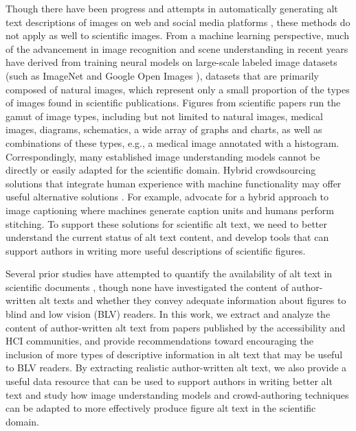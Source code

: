\documentclass[sigconf]{acmart}
\begin{document}
Though there have been progress and attempts in automatically generating alt text descriptions of images on web and social media platforms \citep{Wu2017AutomaticAC, Morris2018RichRO, Gleason2020TwitterAA}, these methods do not apply as well to scientific images. From a machine learning perspective, much of the advancement in image recognition and scene understanding in recent years have derived from training neural models on large-scale labeled image datasets (such as ImageNet \citep{Russakovsky2015ImageNetLS} and Google Open Images \citep{Kuznetsova2020TheOI}), datasets that are primarily composed of natural images, which represent only a small proportion of the types of images found in scientific publications. Figures from scientific papers run the gamut of image types, including but not limited to natural images, medical images, diagrams, schematics, a wide array of graphs and charts, as well as combinations of these types, e.g., a medical image annotated with a histogram. Correspondingly, many established image understanding models cannot be directly or easily adapted for the scientific domain. Hybrid crowdsourcing solutions that integrate human experience with machine functionality may offer useful alternative solutions \citep{Gleason2020TwitterAA, Salisbury2017TowardSS, Gurari2018VizWizGC, qian-formative}. For example, \citet{qian-formative} advocate for a hybrid approach to image captioning where machines generate caption units and humans perform stitching. To support these solutions for scientific alt text, we need to better understand the current status of alt text content, and develop tools that can support authors in writing more useful descriptions of scientific figures. 

Several prior studies have attempted to quantify the availability of alt text in scientific documents \citep{Brady2015CreatingAP, Lazar2017MakingTF, Wang2021ImprovingTA}, though none have investigated the content of author-written alt texts and whether they convey adequate information about figures to blind and low vision (BLV) readers. 
In this work, we extract and analyze the content of author-written alt text from papers published by the accessibility and HCI communities, and provide recommendations toward encouraging the inclusion of more types of descriptive information in alt text that may be useful to BLV readers. By extracting realistic author-written alt text, we also provide a useful data resource that can be used to support authors in writing better alt text and study how image understanding models and crowd-authoring techniques can be adapted to more effectively produce figure alt text in the scientific domain.
\end{document}
